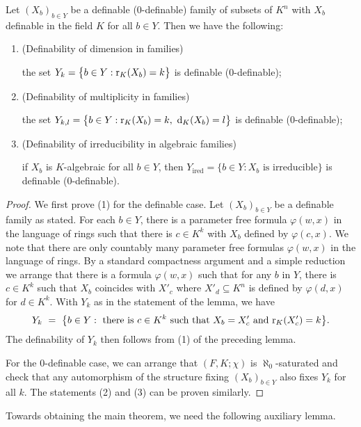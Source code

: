 \begin{cor}\label{DOE2}
Let $( X_b)_{b\in Y}$ be a definable (0-definable) family of subsets of $K^n$ with $X_b$ definable in the field $K$ for all $b \in Y$. Then we have the following:
\begin{enumerate}
\item (Definability of dimension in families)

\noindent
the set $Y_k= \big\{b \in Y : \mathrm{r}_K(X_b) =k \big\}$ is definable ($0$-definable);
\item (Definability of multiplicity in families)

\noindent
the set $Y_{k, l}= \big\{b \in Y : \mathrm{r}_K(X_b) =k,\  \mathrm{d}_K(X_b) = l \big\}$ is definable ($0$-definable);
\item (Definability of irreducibility in algebraic families)

\noindent
if $X_b$ is $K$-algebraic for all $b \in Y$, then $Y_{\mathrm{ired}}= \{b \in Y : X_b \text{ is irreducible} \}$ is definable ($0$-definable).
\end{enumerate}
\end{cor}

\begin{proof}
We first prove (1) for the definable case. Let  $( X_b)_{b\in Y}$ be a definable family as stated. For each $b \in Y$, there is a parameter free formula $\varphi(w, x)$ in the language of rings such that there is $c \in K^{k}$ with $X_b$ defined by $\varphi(c, x)$.
We note that there are only countably many parameter free formulas $\varphi(w,x)$ in the language of rings. 
By a standard compactness argument and a simple reduction we arrange that there is  a formula $\varphi(w,x)$ such that for any $b$ in $Y$, there is $c \in K^{k}$ such that $X_b$ coincides with $X'_c$  where $X'_d \subseteq K^n$ is defined by $\varphi(d, x)$ for $d \in K^k$.  With $Y_k$ as in the statement of the lemma, we have
$$Y_k\ =\ \big\{ b \in Y : \text{ there is } c\in K^{k} \text{ such that } X_b = X'_c \text{ and } \mathrm{r}_K(X'_c) = k  \big\}. $$
The definability of $Y_k$ then follows from (1) of the preceding lemma. 


For the 0-definable case, we can arrange that $(F, K; \chi)$ is $\aleph_0$-saturated and check that any automorphism of the structure fixing $( X_b)_{b\in Y}$ also fixes $Y_{k}$ for all $k$.
The statements (2) and  (3) can be proven similarly.
\end{proof}

\noindent
Towards obtaining the main theorem, we need the following auxiliary lemma.


